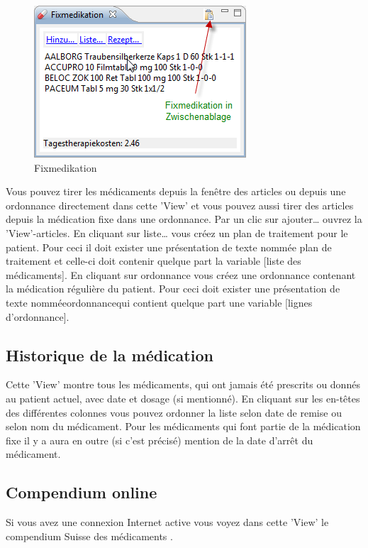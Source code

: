 \begin{figure}[htp]
\begin{center}
  \includegraphics{images/fixmediview}
  \caption{Fixmedikation}
  \label{fig:fixmedi}
\end{center}
\end{figure}
Vous pouvez tirer les médicaments depuis la fenêtre des articles ou depuis une ordonnance directement dans cette 'View' et vous pouvez aussi tirer des articles depuis la médication fixe dans une ordonnance. Par un clic sur  \glqq ajouter\ldots\grqq{} ouvrez la 'View'-articles.  En cliquant sur \glqq liste\ldots\grqq{} vous créez un plan de traitement pour le patient. Pour ceci il doit exister une présentation de texte nommée \glqq plan de traitement\grqq{}
et celle-ci doit contenir quelque part la variable [liste des médicaments]. En cliquant sur  \glqq ordonnance\grqq{} vous créez une ordonnance contenant la médication régulière du patient. Pour ceci doit exister une présentation de texte nommée\glqq ordonnance\grqq qui contient quelque part une variable [lignes d'ordonnance].

\subsection{Historique de la médication }
Cette 'View' montre tous les médicaments, qui ont jamais été prescrits ou donnés au patient actuel, avec date et dosage (si mentionné). En cliquant sur les en-têtes des différentes colonnes vous pouvez ordonner la liste selon date de remise ou selon nom du médicament. Pour les médicaments qui font partie de la médication fixe il y a aura en outre (si c'est précisé) mention de la date d'arrêt du médicament.

\subsection{Compendium online}
Si vous avez une connexion Internet active vous voyez dans cette 'View' le compendium Suisse des médicaments . 

